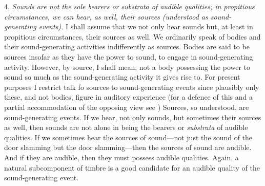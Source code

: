 \documentclass[12pt]{article}
\begin{document}
4. \emph{Sounds are not the sole bearers or \emph{substrata} of audible qualities; in propitious circumstances, we can hear, as well, their sources (understood as sound-generating events).} I shall assume that we not only hear sounds but, at least in propitious circumstances, their sources as well. We ordinarily speak of bodies and their sound-generating activities indifferently as sources. Bodies are said to be sources insofar as they have the power to sound, to engage in sound-generating activity. However, by source, I shall mean, not a body possessing the power to sound so much as the sound-generating activity it gives rise to. For present purposes I restrict talk fo sources to sound-generating events since plausibly only these, and not bodies, figure in auditory experience (for a defence of this and a partial accommodation of the opposing view see \citealt[chapter 3.4]{Kalderon:2018oe}) Sources, so understood, are sound-generating events. If we hear, not only sounds, but sometimes their sources as well, then sounds are not alone in being the bearers or \emph{substrata} of audible qualities. If we sometimes hear the sources of sound---not just the sound of the door slamming but the door slamming---then the sources of sound are audible. And if they are audible, then they must possess audible qualities. Again, a natural subcomponent of timbre is a good candidate for an audible quality of the sound-generating event.
\end{document}
